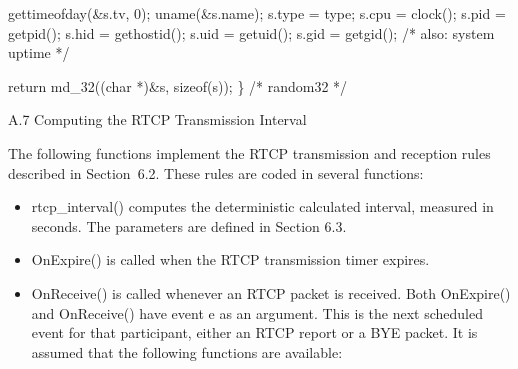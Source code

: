 \documentclass{article}
\begin{document}
gettimeofday(\&s.tv, 0); uname(\&s.name); s.type = type; s.cpu  = clock(); s.pid  = getpid(); s.hid  = gethostid(); s.uid  = getuid(); s.gid  = getgid(); /* also: system uptime */

return md\_32((char *)\&s, sizeof(s)); \}                               /* random32 */

A.7 Computing the RTCP Transmission Interval

The following functions implement the RTCP transmission and reception rules described in Section~6.2.  These rules are coded in several functions:

\begin{itemize}
\item rtcp\_interval() computes the deterministic calculated interval, measured in seconds.  The parameters are defined in Section 6.3.
\item OnExpire() is called when the RTCP transmission timer expires.
\item OnReceive() is called whenever an RTCP packet is received.
Both OnExpire() and OnReceive() have event e as an argument.  This is the next scheduled event for that participant, either an RTCP report or a BYE packet.  It is assumed that the following functions are available:


\end{itemize}
\end{document}

